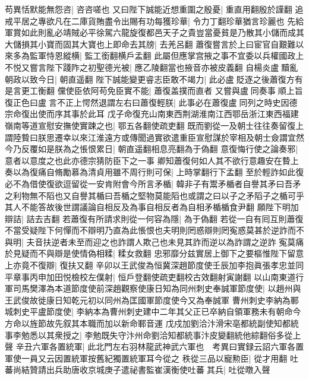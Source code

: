 苟異恬默能無怨咨|{
	咨咨嗟也}
又曰陛下誠能近想重圍之殷憂|{
	重直用翻殷於謹翻}
追戒平居之專欲凡在二庫貨賄盡令出賜有功每獲珍華|{
	令力丁翻珍華猶言珍麗也}
先給軍賞如此則亂必靖賊必平徐駕六龍旋復都邑天子之貴豈當憂貧是乃散其小儲而成其大儲損其小寶而固其大寶也上即命去其牓|{
	去羌呂翻}
蕭復嘗言於上曰宦官自艱難以來多為監軍恃恩縱横|{
	監工銜翻横戶孟翻}
此屬但應掌宫掖之事不宜委以兵權國政上不悦又嘗言陛下踐阼之初聖德光被|{
	應乙陵翻當也掖音亦被皮義翻}
自楊炎盧黷亂朝政以致今日|{
	朝直遥翻}
陛下誠能變更睿志臣敢不竭力|{
	此必盧貶逐之後蕭復方有是言更工衡翻}
儻使臣依阿苟免臣實不能|{
	蕭復盖撲而直者}
又嘗與盧同奏事順上旨復正色曰盧言不正上愕然退謂左右曰蕭復輕朕|{
	此事必在蕭復盧同列之時史因德宗命復出使而序其事於此耳}
戊子命復充山南東西荆湖淮南江西鄂岳浙江東西福建嶺南等道宣慰安撫使實踈之也|{
	鄂五各翻使疏吏翻}
既而劉從一及朝士往往奏留復上謂陸䞇曰朕思遷幸以來江淮遠方或傳聞過實欲遣重臣宣慰謀於宰相及朝士僉謂宜然今乃反覆如是朕為之悵恨累日|{
	朝直遥翻相息亮翻為于偽翻}
意復悔行使之論奏邪|{
	意者以意度之也此亦德宗猜防臣下之一事}
卿知蕭復何如人其不欲行意趣安在䞇上奏以為復痛自脩勵慕為清貞用雖不周行則可保|{
	上時掌翻行下孟翻}
至於輕詐如此復必不為借使復欲逗留從一安肯附會今所言矛楯|{
	韓非子有鬻矛楯者自譽其矛曰吾矛之利物無不䧟也又自譽其楯曰吾楯之堅物莫能䧟也或謂之曰以子之矛䧟子之楯可乎其人不能答故後世謂議論自相反及為事自相反者為自相矛楯楯食尹翻}
願陛下明加辯詰|{
	詰去吉翻}
若蕭復有所請求則從一何容為隱|{
	為于偽翻}
若從一自有囘互則蕭復不當受疑陛下何憚而不辯明乃直為此悵恨也夫明則罔惑辯則罔寃惑莫甚於逆詐而不與明|{
	夫音扶逆者未至而迎之也詐謂人欺己也未見其詐而逆以為詐謂之逆詐}
寃莫痛於見疑而不與辯是使情偽相糅|{
	糅女救翻}
忠邪靡分兹實居上御下之要樞惟陛下留意上亦竟不復辯|{
	復扶又翻}
辛卯以王武俊為恒冀深趙節度使壬辰加李抱眞張孝忠並同平章事丙申加田悦檢校左僕射|{
	恒戶登翻使疏吏翻校古效翻射寅謝翻}
以山南東道行軍司馬樊澤為本道節度使前深趙觀察使康日知為同州刺史奉誠軍節度使|{
	以趙州與王武俊故徙康日知乾元初以同州為匡國軍節度使今又為奉誠軍}
曹州刺史李納為鄆城刺史平盧節度使|{
	李納本為曹州刺史建中二年其父正已卒納自領軍務未有朝命今方命以旌節故先叙其本職而加以新命鄆音運}
戊戍加劉洽汴滑宋亳都統副使知都統事李勉悉以其衆授之|{
	李勉既失守汴州命劉洽知都統事汴皮變翻統他綜翻俗多從上聲}
辛丑六軍各置統軍|{
	此北門左右羽林龍武神武六軍也　考異曰實録云詔六軍各置軍使一員又云因置統軍按舊紀獨置統軍耳今從之}
秩從三品以寵勲臣|{
	從才用翻}
吐蕃尚結贊請出兵助唐收京城庚子遣祕書監崔漢衡使吐蕃其兵|{
	吐從暾入聲}


